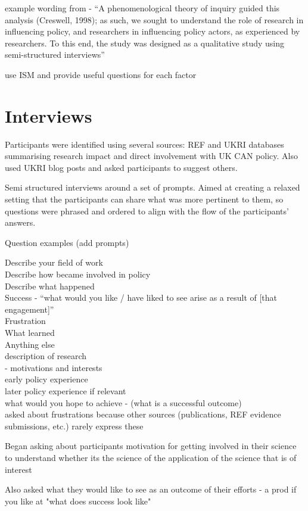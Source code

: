 example wording from \cite{KothariME2009} - ``A phenomenological theory of inquiry guided this analysis (Creswell, 1998); as such, we sought to understand the role of research in influencing policy, and researchers in influencing policy actors, as experienced by researchers. To this end, the study was designed as a qualitative study using semi-structured interviews''

\cite{MinamitaniDOI2024} use ISM and provide useful questions for each factor

\section{Interviews}
Participants were identified using several sources: REF and UKRI databases summarising research impact and direct involvement with UK CAN policy. Also used UKRI blog posts and asked participants to suggest others.

Semi structured interviews around a set of prompts. Aimed at creating a relaxed setting that the participants can share what was more pertinent to them, so questions were phrased and ordered to align with the flow of the participants' answers.

Question examples (add prompts)

Describe your field of work\\
Describe how became involved in policy\\
Describe what happened\\
Success - ``what would you like / have liked to see arise as a result of [that engagement]''\\
Frustration\\
What learned\\
Anything else\\
description of research\\
 - motivations and interests\\
early policy experience\\
later policy experience if relevant\\
what would you hope to achieve - (what is a successful outcome)\\
asked about frustrations because other sources (publications, REF evidence submissions, etc.) rarely express these

Began asking about participants motivation for getting involved in their science to understand whether its the science of the application of the science that is of interest

Also asked what they would like to see as an outcome of their efforts - a prod if you like at "what does success look like"

